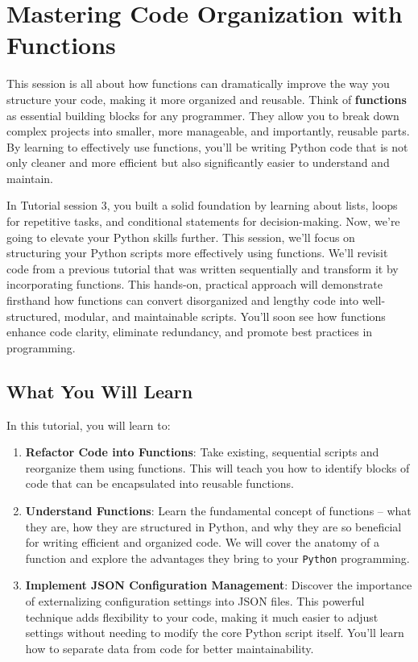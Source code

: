 \section{Mastering Code Organization with Functions}

This session is all about how functions can dramatically improve the way you structure your code, making it more organized and reusable. Think of \textbf{functions} as essential building blocks for any programmer. They allow you to break down complex projects into smaller, more manageable, and importantly, reusable parts. By learning to effectively use functions, you'll be writing Python code that is not only cleaner and more efficient but also significantly easier to understand and maintain.

In Tutorial session 3, you built a solid foundation by learning about lists, loops for repetitive tasks, and conditional statements for decision-making. Now, we're going to elevate your Python skills further. This session, we'll focus on structuring your Python scripts more effectively using functions. We'll revisit code from a previous tutorial that was written sequentially and transform it by incorporating functions. This hands-on, practical approach will demonstrate firsthand how functions can convert disorganized and lengthy code into well-structured, modular, and maintainable scripts. You'll soon see how functions enhance code clarity, eliminate redundancy, and promote best practices in programming.

\subsection{What You Will Learn}
In this tutorial, you will learn to:
\begin{enumerate}\setlength{\itemsep}{5pt}
\item \textbf{Refactor Code into Functions}: Take existing, sequential scripts and reorganize them using functions. This will teach you how to identify blocks of code that can be encapsulated into reusable functions.
\item \textbf{Understand Functions}: Learn the fundamental concept of functions – what they are, how they are structured in Python, and why they are so beneficial for writing efficient and organized code. We will cover the anatomy of a function and explore the advantages they bring to your \texttt{Python} programming.
\item \textbf{Implement JSON Configuration Management}: Discover the importance of externalizing configuration settings into JSON files. This powerful technique adds flexibility to your code, making it much easier to adjust settings without needing to modify the core Python script itself. You'll learn how to separate data from code for better maintainability.
\end{enumerate}

